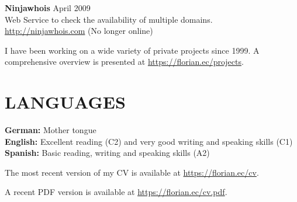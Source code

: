 \documentclass[margin]{res}
\begin{document}
\begin{resume}
\textbf{Ninjawhois} \hfill April 2009 \\
	Web Service to check the availability of multiple domains. \\ \url{http://ninjawhois.com} (No longer online)

I have been working on a wide variety of private projects since 1999. A comprehensive overview is presented at \url{https://florian.ec/projects}.


\section{LANGUAGES}

\textbf{German:} Mother tongue \\
\textbf{English:} Excellent reading (C2) and very good writing and speaking skills (C1) \\
\textbf{Spanish:} Basic reading, writing and speaking skills (A2)


\end{resume}

\vspace{15 mm}

The most recent version of my CV is available at \url{https://florian.ec/cv}.

A recent PDF version is available at \url{https://florian.ec/cv.pdf}.
\end{document}
